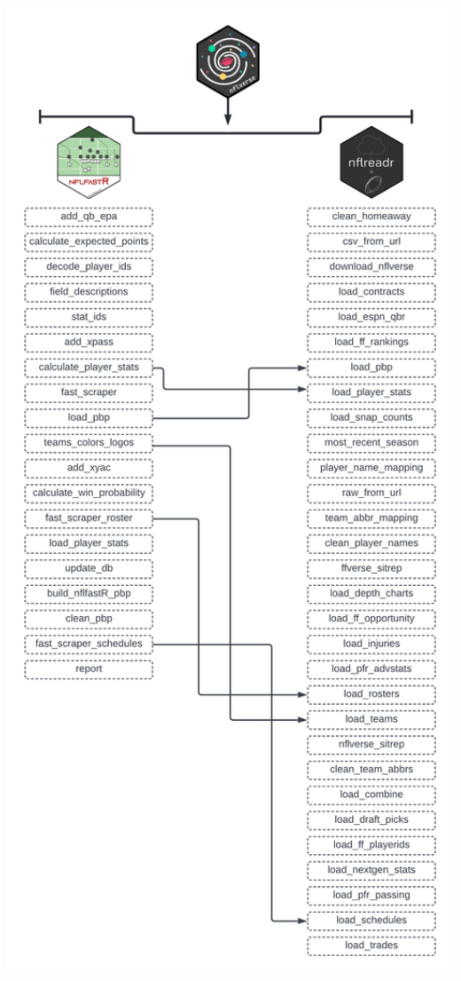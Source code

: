 \documentclass[
  letterpaper,
]{krantz}
\begin{document}
\includegraphics[width=1\textwidth,height=\textheight]{images/updated-diagram.png}
\end{document}

